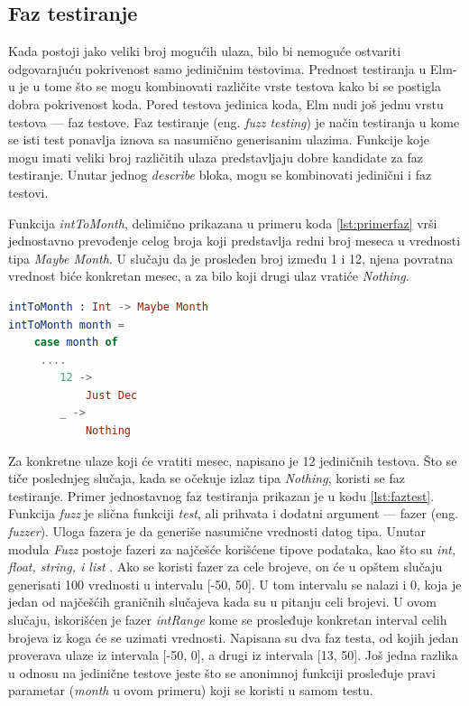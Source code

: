\documentclass[12pt,oneside]{memoir}
\begin{document}
\subsection{Faz testiranje}
\par Kada postoji jako veliki broj mogućih ulaza, bilo bi nemoguće ostvariti odgovarajuću pokrivenost samo jediničnim testovima. Prednost testiranja u Elm-u je u tome što se mogu kombinovati različite vrste testova kako bi se postigla dobra pokrivenost koda. Pored testova jedinica koda, Elm nudi još jednu vrstu testova --- faz testove. Faz testiranje (eng. \emph{fuzz testing}) je način testiranja u kome se isti test ponavlja iznova sa nasumično generisanim ulazima. Funkcije koje mogu imati veliki broj različitih ulaza predstavljaju dobre kandidate za faz testiranje. Unutar jednog \emph{describe} bloka, mogu se kombinovati jedinični i faz testovi.
\par Funkcija \emph{intToMonth}, delimično prikazana u primeru koda \ref{lst:primerfaz} vrši jednostavno prevođenje celog broja koji predstavlja redni broj meseca u vrednosti tipa \emph{Maybe Month}. U slučaju da je prosleđen broj između 1 i 12, njena povratna vrednost biće konkretan mesec, a za bilo koji drugi ulaz vratiće \emph{Nothing}.

\begin{lstlisting}[language=elm, caption={Implementacija funkcije \emph{intToMonth}},captionpos=b, label={lst:primerfaz}]
intToMonth : Int -> Maybe Month
intToMonth month =
    case month of
     .... 
        12 ->
            Just Dec
        _ ->
            Nothing
\end{lstlisting}

\par Za konkretne ulaze koji će vratiti mesec, napisano je 12 jediničnih testova. Što se tiče poslednjeg slučaja, kada se očekuje izlaz tipa \emph{Nothing}, koristi se faz testiranje. Primer jednostavnog faz testiranja prikazan je u kodu \ref{lst:faztest}. Funkcija \emph{fuzz} je slična funkciji \emph{test}, ali prihvata i dodatni argument --- fazer (eng. \emph{fuzzer}). Uloga fazera je da generiše nasumične vrednosti datog tipa. Unutar modula \emph{Fuzz} postoje fazeri za najčešće korišćene tipove podataka, kao što su \emph{int, float, string, i list} \cite{fuzz}. Ako se koristi fazer za cele brojeve, on će u opštem slučaju generisati 100 vrednosti u intervalu [-50, 50]. U tom intervalu se nalazi i 0, koja je jedan od najčešćih graničnih slučajeva kada su u pitanju celi brojevi. U ovom slučaju, iskorišćen je fazer \emph{intRange} kome se prosleđuje konkretan interval celih brojeva iz koga će se uzimati vrednosti. Napisana su dva faz testa, od kojih jedan proverava ulaze iz intervala [-50, 0], a drugi iz intervala [13, 50]. Još jedna razlika u odnosu na jedinične testove jeste što se anonimnoj funkciji prosleđuje pravi parametar (\emph{month} u ovom primeru) koji se koristi u samom testu. 
\end{document}
